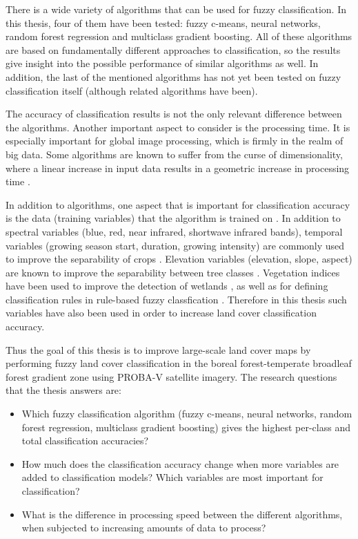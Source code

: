 \documentclass[a4paper,10pt]{book}
\begin{document}
There is a wide variety of algorithms that can be used for fuzzy classification. In this thesis, four of them have been tested: fuzzy c-means, neural networks, random forest regression and multiclass gradient boosting. All of these algorithms are based on fundamentally different approaches to classification, so the results give insight into the possible performance of similar algorithms as well. In addition, the last of the mentioned algorithms has not yet been tested on fuzzy classification itself (although related algorithms have been).

The accuracy of classification results is not the only relevant difference between the algorithms. Another important aspect to consider is the processing time. It is especially important for global image processing, which is firmly in the realm of big data. Some algorithms are known to suffer from the curse of dimensionality, where a linear increase in input data results in a geometric increase in processing time \citep{walton2008subpixelrf}.

In addition to algorithms, one aspect that is important for classification accuracy is the data (training variables) that the algorithm is trained on \citep{yu2014metadiscoveries}. In addition to spectral variables (blue, red, near infrared, shortwave infrared bands), temporal variables (growing season start, duration, growing intensity) are commonly used to improve the separability of crops \citep{jakubauskas2001harmonic}. Elevation variables (elevation, slope, aspect) are known to improve the separability between tree classes \citep{burrough2001fuzzy}. Vegetation indices have been used to improve the detection of wetlands \citep{sader1995wetlands}, as well as for defining classification rules in rule-based fuzzy classfication \citep{baraldi2006rulebased}. Therefore in this thesis such variables have also been used in order to increase land cover classification accuracy.

Thus the goal of this thesis is to improve large-scale land cover maps by performing fuzzy land cover classification in the boreal forest-temperate broadleaf forest gradient zone using PROBA-V satellite imagery. The research questions that the thesis answers are:

\begin{itemize}
 \item Which fuzzy classification algorithm (fuzzy c-means, neural networks, random forest regression, multiclass gradient boosting) gives the highest per-class and total classification accuracies?
 \item How much does the classification accuracy change when more variables are added to classification models? Which variables are most important for classification?
 \item What is the difference in processing speed between the different algorithms, when subjected to increasing amounts of data to process?
\end{itemize}
\end{document}
